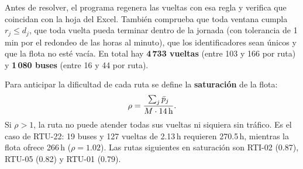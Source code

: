 Antes de resolver, el programa regenera las vueltas con esa regla y verifica que coincidan con la hoja del Excel. También comprueba que toda ventana cumpla $r_j \le d_j$, que toda vuelta pueda terminar dentro de la jornada (con tolerancia de 1\,min por el redondeo de las horas al minuto), que los identificadores sean únicos y que la flota no esté vacía. En total hay \textbf{4\,733 vueltas} (entre 103 y 166 por ruta) y \textbf{1\,080 buses} (entre 16 y 44 por ruta).

Para anticipar la dificultad de cada ruta se define la \textbf{saturación} de la flota:
\begin{equation}
  \rho = \frac{\sum_j \bar{p}_j}{M \cdot 14\,\text{h}} .
\end{equation}
Si $\rho > 1$, la ruta no puede atender todas sus vueltas ni siquiera sin tráfico. Es el caso de RTU-22: 19 buses y 127 vueltas de 2.13\,h requieren 270.5\,h, mientras la flota ofrece 266\,h ($\rho = 1.02$). Las rutas siguientes en saturación son RTI-02 (0.87), RTU-05 (0.82) y RTU-01 (0.79).
